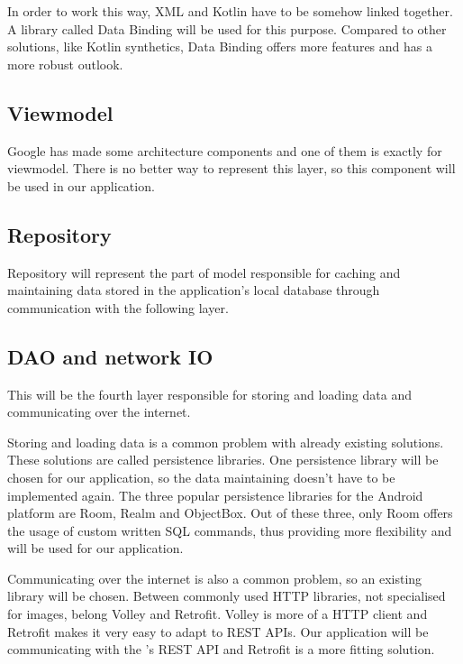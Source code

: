 In order to work this way, XML and Kotlin have to be somehow linked together.
A library called Data Binding will be used for this purpose.
Compared to other solutions, like Kotlin synthetics, Data Binding offers more features and has a more robust outlook.

\subsection{Viewmodel}
Google has made some architecture components and one of them is exactly for viewmodel.
There is no better way to represent this layer, so this component will be used in our application.

\subsection{Repository}
Repository will represent the part of model responsible for caching and maintaining data stored in the application's local database through communication with the following layer.

\subsection{DAO and network IO}
This will be the fourth layer responsible for storing and loading data and communicating over the internet.

Storing and loading data is a common problem with already existing solutions.
These solutions are called persistence libraries.
One persistence library will be chosen for our application, so the data maintaining doesn't have to be implemented again.
The three popular persistence libraries for the Android platform are Room\cite{room}, Realm\cite{realm} and ObjectBox\cite{objectbox}.
Out of these three, only Room offers the usage of custom written SQL commands, thus providing more flexibility and will be used for our application.

Communicating over the internet is also a common problem, so an existing library will be chosen.
Between commonly used HTTP libraries, not specialised for images, belong Volley\cite{volley} and Retrofit\cite{retrofit}.
Volley is more of a HTTP client and Retrofit makes it very easy to adapt to REST APIs.
Our application will be communicating with the \etl 's REST API and Retrofit is a more fitting solution.

